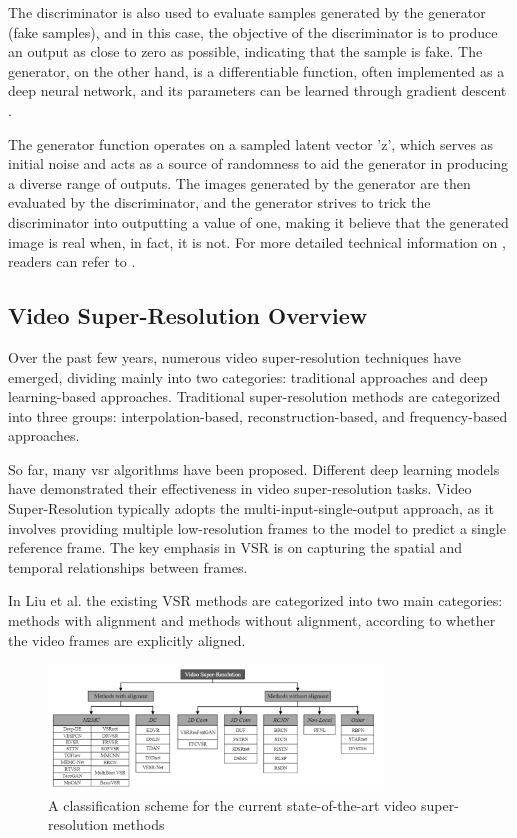 \documentclass[conference]{IEEEtran}
\begin{document}
The discriminator is also used to evaluate samples generated by the generator (fake samples), and in this case, the objective of the discriminator is to produce an output as close to zero as possible, indicating that the sample is fake. The generator, on the other hand, is a differentiable function, often implemented as a deep neural network, and its parameters can be learned through gradient descent \cite{gans_overview_2018}.

The generator function operates on a sampled latent vector 'z', which serves as initial noise and acts as a source of randomness to aid the generator in producing a diverse range of outputs. The images generated by the generator are then evaluated by the discriminator, and the generator strives to trick the discriminator into outputting a value of one, making it believe that the generated image is real when, in fact, it is not. For more detailed technical information on , readers can refer to \cite{gans_overview_2018}.

\subsection{Video Super-Resolution Overview}

Over the past few years, numerous video super-resolution techniques have emerged, dividing mainly into two categories: traditional approaches and deep learning-based approaches. Traditional super-resolution methods are categorized into three groups: interpolation-based, reconstruction-based, and frequency-based approaches.

So far, many \acrshort{vsr} algorithms have been proposed. Different deep learning models have demonstrated their effectiveness in video super-resolution tasks. Video Super-Resolution typically adopts the multi-input-single-output approach, as it involves providing multiple low-resolution frames to the model to predict a single reference frame. The key emphasis in VSR is on capturing the spatial and temporal relationships between frames.

In Liu et al. \cite{video_super_resolution_survey_2020} the existing VSR methods are categorized into two main categories: methods with alignment and methods without alignment, according to whether the video frames are explicitly aligned.

\begin{figure}[t]
    \centering
    \centerline{\includegraphics[width=8.9cm]{vsr_methods}}
    \caption{A classification scheme for the current state-of-the-art video super-resolution methods \cite{video_super_resolution_survey_2020}}
    \label{fig:vsr_methods}
\end{figure}
\end{document}
